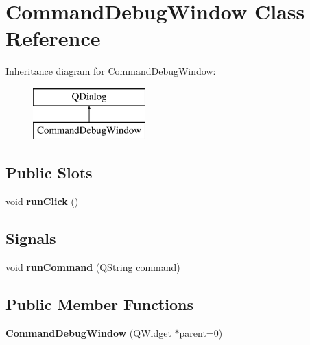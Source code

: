 \hypertarget{class_command_debug_window}{}\section{Command\+Debug\+Window Class Reference}
\label{class_command_debug_window}
Inheritance diagram for Command\+Debug\+Window\+:\begin{figure}[H]
\begin{center}
\leavevmode
\includegraphics[height=2.000000cm]{class_command_debug_window}
\end{center}
\end{figure}
\subsection*{Public Slots}
\begin{DoxyCompactItemize}
\item 
\hypertarget{class_command_debug_window_abaaedef19fa6eb19aaf2ceeeb2ae4e99}{}void {\bfseries run\+Click} ()\label{class_command_debug_window_abaaedef19fa6eb19aaf2ceeeb2ae4e99}

\end{DoxyCompactItemize}
\subsection*{Signals}
\begin{DoxyCompactItemize}
\item 
\hypertarget{class_command_debug_window_aa6e7a92d27e60cd1c8c201310ff093e4}{}void {\bfseries run\+Command} (Q\+String command)\label{class_command_debug_window_aa6e7a92d27e60cd1c8c201310ff093e4}

\end{DoxyCompactItemize}
\subsection*{Public Member Functions}
\begin{DoxyCompactItemize}
\item 
\hypertarget{class_command_debug_window_aa9ea78c695bf4b4c0ff0314396282ccb}{}{\bfseries Command\+Debug\+Window} (Q\+Widget $\ast$parent=0)\label{class_command_debug_window_aa9ea78c695bf4b4c0ff0314396282ccb}

\end{DoxyCompactItemize}

